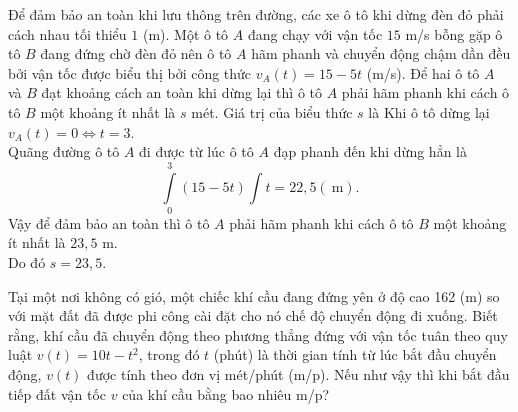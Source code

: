 \begin{ex}%
Để đảm bảo an toàn khi lưu thông trên đường, các xe ô tô khi dừng đèn đỏ phải cách nhau tối thiểu $1$ (m). Một ô tô $A$ đang chạy với vận tốc $15$ m/s bỗng gặp ô tô $B$ đang đứng chờ đèn đỏ nên ô tô $A$ hãm phanh và chuyển động chậm dần đều bởi vận tốc được biểu thị bởi công thức $v_A(t)=15-5 t$ (m/s). Để hai ô tô $A$ và $B$ đạt khoảng cách an toàn khi dừng lại thì ô tô $A$ phải hãm phanh khi cách ô tô $B$ một khoảng ít nhất là $s$ mét. Giá trị của biểu thức $s$ là
\loigiai
{Khi ô tô dừng lại $v_A(t)=0 \Leftrightarrow t=3$.\\
Quãng đường ô tô $A$ đi được từ lúc ô tô $A$ đạp phanh đến khi dừng hẳn là
\[\displaystyle\int\limits_0^3(15-5 t)\displaystyle\int\limits t=22,5 (\mathrm{~m}).\]
Vậy để đảm bảo an toàn thì ô tô $A$ phải hãm phanh khi cách ô tô $B$ một khoảng ít nhất là $23{,}5$ m.\\
Do đó $s=23{,}5$.
}
\end{ex}

\begin{ex}%
Tại một nơi không có gió, một chiếc khí cầu đang đứng yên ở độ cao 162 (m) so với mặt đất đã được phi công cài đặt cho nó chế độ chuyển động đi xuống. Biết rằng, khí cầu đã chuyển động theo phương thẳng đứng với vận tốc tuân theo quy luật $v(t)=10 t-t^2$, trong đó $t$ (phút) là thời gian tính từ lúc bắt đầu chuyển động, $v(t)$ được tính theo đơn vị mét/phút (m/p). Nếu như vậy thì khi bắt đầu tiếp đất vận tốc $v$ của khí cầu bằng bao nhiêu m/p?
\end{ex}

